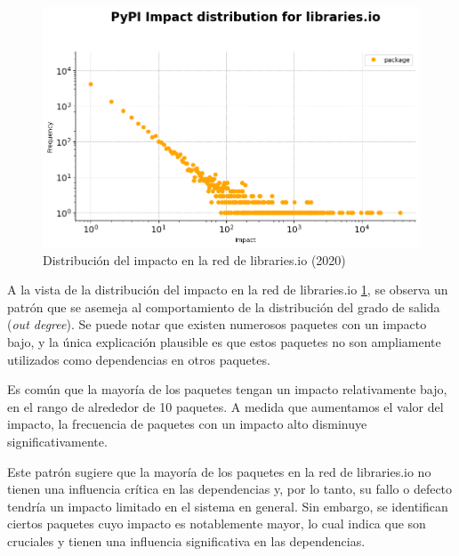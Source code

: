 \begin{figure}[ht!]
    \begin{center}
        \includegraphics[width=1\textwidth]{img/pypi/librariesio_impact_distribution.png}
        \caption{Distribución del impacto en la red de libraries.io (2020)}
        \label{fig:Distribución del impacto en la red de libraries.io}
    \end{center}
\end{figure}

A la vista de la distribución del impacto en la red de libraries.io \ref{fig:Distribución del impacto en la red de libraries.io}, se observa un patrón que se
asemeja al comportamiento de la distribución del grado de salida (\textit{out degree}). Se puede notar
que existen numerosos paquetes con un impacto bajo, y la única explicación plausible es que estos paquetes
no son ampliamente utilizados como dependencias en otros paquetes.

Es común que la mayoría de los paquetes tengan un impacto relativamente bajo, en el rango de alrededor
de 10 paquetes. A medida que aumentamos el valor del impacto, la frecuencia de paquetes con un impacto
alto disminuye significativamente.

Este patrón sugiere que la mayoría de los paquetes en la red de libraries.io no tienen una influencia
crítica en las dependencias y, por lo tanto, su fallo o defecto tendría un impacto limitado en el
sistema en general. Sin embargo, se
identifican ciertos paquetes cuyo impacto es notablemente mayor, lo cual indica que son cruciales
y tienen una influencia significativa en las dependencias.

